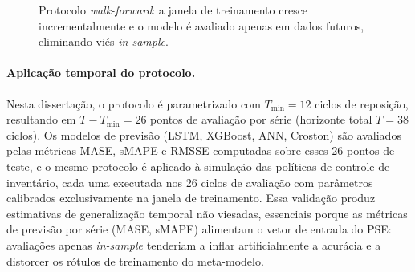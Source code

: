 \begin{figure}[htbp]
\centering
{}
\caption{Protocolo \textit{walk-forward}: a janela de treinamento cresce incrementalmente e o modelo é avaliado apenas em dados futuros, eliminando viés \textit{in-sample}.}
\label{fig:walkforward}
\end{figure}

\paragraph{Aplicação temporal do protocolo.} Nesta dissertação, o protocolo é parametrizado com $T_{\min} = 12$ ciclos de reposição, resultando em $T - T_{\min} = 26$ pontos de avaliação por série (horizonte total $T = 38$ ciclos). Os modelos de previsão (LSTM, XGBoost, ANN, Croston) são avaliados pelas métricas MASE, sMAPE e RMSSE computadas sobre esses 26 pontos de teste, e o mesmo protocolo é aplicado à simulação das políticas de controle de inventário, cada uma executada nos 26 ciclos de avaliação com parâmetros calibrados exclusivamente na janela de treinamento. Essa validação produz estimativas de generalização temporal não viesadas, essenciais porque as métricas de previsão por série (MASE, sMAPE) alimentam o vetor de entrada do PSE: avaliações apenas \textit{in-sample} tenderiam a inflar artificialmente a acurácia e a distorcer os rótulos de treinamento do meta-modelo.

